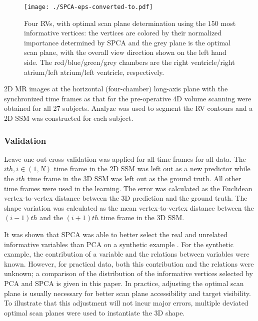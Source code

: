 \documentclass[review]{elsarticle}
\begin{document}
\begin{figure}[thpb]
\centering
\texttt{[image: ./SPCA-eps-converted-to.pdf]}
\caption{Four RVs, with optimal scan plane determination using the $150$ most informative vertices: the vertices are colored by their normalized importance determined by SPCA and the grey plane is the optimal scan plane, with the overall view direction shown on the left hand side. The red/blue/green/grey chambers are the right ventricle/right atrium/left atrium/left ventricle, respectively.}
\label{fig:SPCA}
\end{figure}

2D MR images at the horizontal (four-chamber) long-axis plane with the synchronized time frames as that for the pre-operative 4D volume scanning were obtained for all 27 subjects. Analyze was used to segment the RV contours and a 2D SSM was constructed for each subject.

\subsubsection{Validation}
Leave-one-out cross validation was applied for all time frames for all data. The $ith, i\in (1,N)$ time frame in the 2D SSM was left out as a new predictor while the $ith$ time frame in the 3D SSM was left out as the ground truth. All other time frames were used in the learning. The error was calculated as the Euclidean vertex-to-vertex distance between the 3D prediction and the ground truth. The shape variation was calculated as the mean vertex-to-vertex distance between the $(i-1)th$ and the $(i+1)th$ time frame in the 3D SSM.

It was shown that SPCA was able to better select the real and unrelated informative variables than PCA on a synthetic example \citep{zou2006sparse}. For the synthetic example, the contribution of a variable and the relations between variables were known. However, for practical data, both this contribution and the relations were unknown; a comparison of the distribution of the informative vertices selected by PCA and SPCA is given in this paper. In practice, adjusting the optimal scan plane is usually necessary for better scan plane accessibility and target visibility. To illustrate that this adjustment will not incur major errors, multiple deviated optimal scan planes were used to instantiate the 3D shape.
\end{document}
